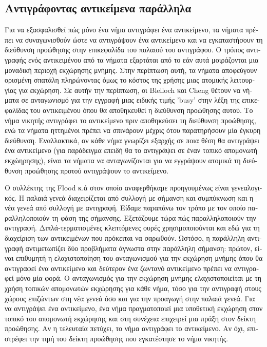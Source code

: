 \begin{greek}
\subsection{Αντιγράφοντας αντικείμενα παράλληλα}
Για να εξασφαλισθεί πώς μόνο ένα νήμα αντιγράφει ένα αντικείμενο,
τα νήματα πρέπει να συναγωνισθούν ώστε να αντιγράψουν ένα αντικείμενο
και να εγκαταστήσουν τη διεύθυνση προώθησης στην επικεφαλίδα
του παλαιού του αντιγράφου. Ο τρόπος αντιγραφής ενός αντικειμένου
από τα νήματα εξαρτάται από το εάν αυτά μοιράζονται μια μοναδική
περιοχή εκχώρησης μνήμης. Στην περίπτωση αυτή, τα νήματα αποφεύγουν
ορισμένη σπατάλη πληρώνοντας όμως το κόστος της χρήσης μιας
ατομικής λειτουργίας για εκχώρηση. Σε αυτήν την περίπτωση, οι
Blelloch και Cheng \cite{DBLP:conf/pldi/BlellochC99} θέτουν
να νήματα σε ανταγωνισμό για την εγγραφή μιας ειδικής τιμής
'busy' στην λέξη της επικεφαλίδας του αντικειμένου όπου θα
αποθηκευθεί η διεύθυνση προώθησης αυτού. Το νήμα νικητής αντιγράφει
το αντικείμενο πριν αποθηκεύσει τη διεύθυνση προώθησης, ενώ
τα νήματα ηττημένοι πρέπει να σπινάρουν μέχρις ότου παρατηρήσουν
μία έγκυρη διεύθυνση. Εναλλακτικά, αν κάθε νήμα γνωρίζει εξαρχής
σε ποια θέση θα αντιγράψει ένα αντικείμενο (για παράδειγμα
επειδή θα το αντιγράψει σε έναν τοπικό απομονωτή εκχώηρησης),
είναι τα νήματα να ανταγωνίζονται για να εγγράψουν ατομικά
τη διεύθυνση προώθησης προτού αντιγράψουν το αντικείμενο.

Ο συλλέκτης της Flood κ.ά \cite{DBLP:conf/jvm/FloodDSZ01} στον
οποίο αναφερθήκαμε προηγουμένως είναι γενεαλογικός. Η παλαιά
γενεά διαχειρίζεται από συλλογή με σήμανση και συμπύκνωση και
η νέα γενεά από συλλογή με αντιγραφή. Είδαμε παραπάνω τον
τρόπο με τον οποίο παραλληλοποιούν τη φάση της σήμανσης.
Εξετάζουμε τώρα πώς παραλληλοποιούν την αντιγραφή. Διπλά-τερματισμένες
κλεπτόμενες ουρές χρησιμοποιούνται και εδώ για τη διαχείριση
των αντικειμένων που πρόκειται να σαρωθούν. Ωστόσο, η παράλληλη αντιγραφή αντιμετωπίζει δύο
προβλήματα άγνωστα στην παράλληλη σήμανση: πρώτον, είναι επιθυμητή
η ελαχιστοποίηση του ανταγωνισμού για την εκχώρηση μνήμης όπου
θα αντιγραφεί ένα αντικείμενο και δεύτερον ένα ζωντανό αντικείμενο
πρέπει να αντιγραφεί μόνο μία φορά. Ο ανταγωνισμός για την
εκχώρηση μνήμης ελαχιστοποιείται με τη χρήση τοπικών απομονωτών
εκχώρησης για κάθε νήμα, τόσο για την αντιγραφή στους χώρους
επιζώντων στη νέα γενεά όσο και για την προαγωγή στην παλαιά
γενεά. Για να αντιγράψει ένα αντικείμενο, ένα νήμα πραγματοποιεί
μια υποθετική εκχώρηση στον τοπικό του απομονωτή εκχώρησης
και στη συνέχεια επιχειρεί μια πράξη 
στον δείκτη προώθησης. Αν η τελευταία πετύχει, το νήμα αντιγράφει
το αντικείμενο. Αν όχι, επιστρέφει την τιμή του δείκτη προώθησης
που εγκατέστησε το νήμα νικητής.


\end{greek}
